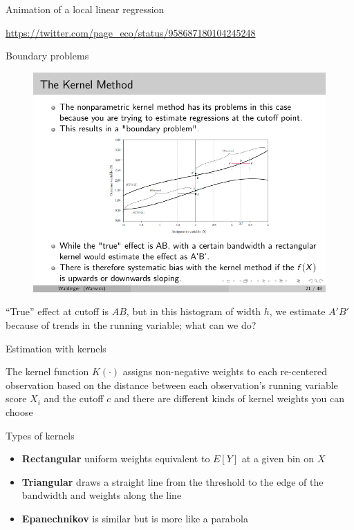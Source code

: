 \documentclass{beamer}
\begin{document}
\begin{frame}{Animation of a local linear regression}

\url{https://twitter.com/page_eco/status/958687180104245248}

\end{frame}


\begin{frame}{Boundary problems}
	
		\begin{figure}
		\includegraphics[scale=1.2]{./lecture_includes/kernel_1.pdf}
		\end{figure}

``True'' effect at cutoff is $AB$, but in this histogram of width $h$, we estimate $A'B'$ because of trends in the running variable; what can we do?

	
\end{frame}



\begin{frame}{Estimation with kernels}

The kernel function $K(\cdot)$ assigns non-negative weights to each re-centered observation based on the distance between each observation's running variable score $X_i$ and the cutoff $c$ and there are different kinds of kernel weights you can choose

\end{frame}

\begin{frame}{Types of kernels}

\begin{itemize}
	\item \textbf{Rectangular} uniform weights equivalent to $E[Y]$ at a given bin on $X$
	\item \textbf{Triangular} draws a straight line from the threshold to the edge of the bandwidth and weights along the line
	\item \textbf{Epanechnikov} is similar but is more like a parabola
\end{itemize}
\end{frame}
\end{document}
